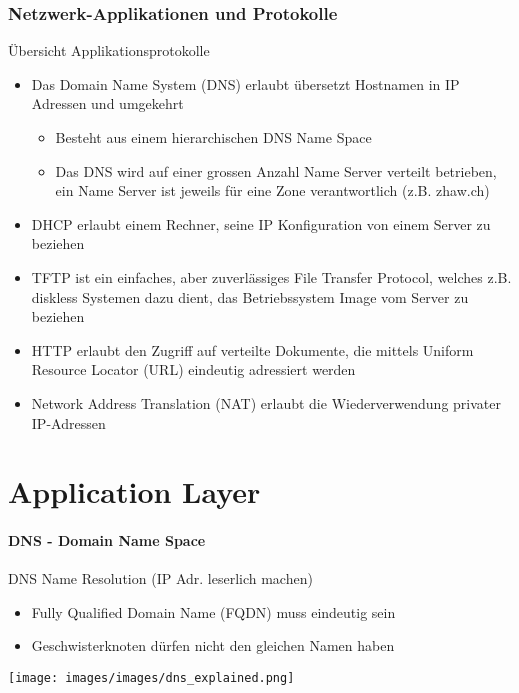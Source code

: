 

\subsubsection*{Netzwerk-Applikationen und Protokolle}

\begin{KR}{Übersicht Applikationsprotokolle}
    \begin{itemize}
        \item Das Domain Name System (DNS) erlaubt übersetzt Hostnamen in IP Adressen und umgekehrt
        \begin{itemize}
            \item Besteht aus einem hierarchischen DNS Name Space
            \item Das DNS wird auf einer grossen Anzahl Name Server verteilt betrieben, ein Name Server ist jeweils für eine Zone verantwortlich (z.B. zhaw.ch)
        \end{itemize}
        \item DHCP erlaubt einem Rechner, seine IP Konfiguration von einem Server zu beziehen
        \item TFTP ist ein einfaches, aber zuverlässiges File Transfer Protocol, welches z.B. diskless Systemen dazu dient, das Betriebssystem Image vom Server zu beziehen
        \item HTTP erlaubt den Zugriff auf verteilte Dokumente, die mittels Uniform Resource Locator (URL) eindeutig adressiert werden
        \item Network Address Translation (NAT) erlaubt die Wiederverwendung privater IP-Adressen
    \end{itemize}
\end{KR}

\section{Application Layer}

\paragraph{DNS - Domain Name Space}

\begin{definition}{DNS} Name Resolution (IP Adr. leserlich machen)
    \begin{itemize}
        \item Fully Qualified Domain Name (FQDN) muss eindeutig sein
        \item Geschwisterknoten dürfen nicht den gleichen Namen haben
    \end{itemize}
    \texttt{[image: images/images/dns\_explained.png]}
\end{definition}

